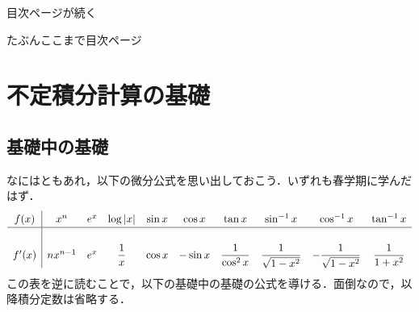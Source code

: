 \documentclass[10pt, uplatex, dvipdfmx]{jsarticle}
\theoremstyle{definition}
\numberwithin{equation}{section}
\begin{document}
\thispagestyle{empty}

\clearpage

\tableofcontents

\newpage

目次ページが続く

\newpage

たぶんここまで目次ページ

\newpage

\section{不定積分計算の基礎}

\subsection{基礎中の基礎}\label{subsec:fundamental}

なにはともあれ，以下の微分公式を思い出しておこう．いずれも春学期に学んだはず．
\[\renewcommand{\arraystretch}{1.3}
  \begin{array}[h]{c|ccccccccc}
    f(x) & x^n & e^x & \log|x| & \sin x & \cos x & \tan x & \sin^{-1}x & \cos ^{-1} x & \tan^{-1} x\\ \hline
    \\
    f'(x) & n x^{n-1} & e^x & \dfrac{1}{x} & \cos x & -\sin x & \dfrac{1}{\cos^2x} & \dfrac{1}{\sqrt{1-x^2}}
                                                                       & -\dfrac{1}{\sqrt{1-x^2}} & \dfrac{1}{1+x^2}
  \end{array}
\]
この表を逆に読むことで，以下の基礎中の基礎の公式を導ける．面倒なので，以降積分定数は省略する．

\vspace{1zh}
\end{document}
